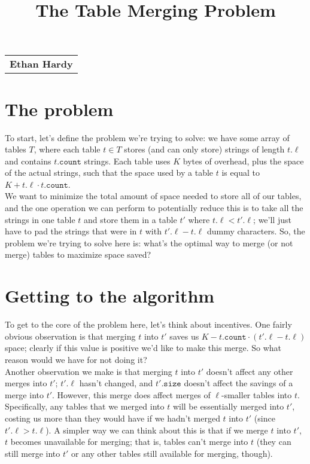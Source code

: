 \documentclass{article}[12]
\title{\textbf{The Table Merging Problem}\vspace{-5ex}}
\date{}
\begin{document}
\maketitle

\null\hfill\begin{tabular}[t]{l@{}}
  \textbf{Ethan Hardy} \\
\end{tabular}

\section{The problem}

To start, let's define the problem we're trying to solve: we have some array of tables $T$, where each table $t \in T$ stores (and can only store) strings of length $t.\ell$ and contains $t.\texttt{count}$ strings. Each table uses $K$ bytes of overhead, plus the space of the actual strings, such that the space used by a table $t$ is equal to $K + t.\ell \cdot t.\texttt{count}$.\\

We want to minimize the total amount of space needed to store all of our tables, and the one operation we can perform to potentially reduce this is to take all the strings in one table $t$ and store them in a table $t'$ where $t.\ell < t'.\ell$; we'll just have to pad the strings that were in $t$ with $t'.\ell - t.\ell$ dummy characters. So, the problem we're trying to solve here is: what's the optimal way to merge (or not merge) tables to maximize space saved?

\section{Getting to the algorithm}
To get to the core of the problem here, let's think about incentives. One fairly obvious observation is that merging $t$ into $t'$ saves us $K - t.\texttt{count} \cdot (t'.\ell - t.\ell)$ space; clearly if this value is positive we'd like to make this merge. So what reason would we have for not doing it?\\

Another observation we make is that merging $t$ into $t'$ doesn't affect any other merges into $t'$; $t'.\ell$ hasn't changed, and $t'.\texttt{size}$ doesn't affect the savings of a merge into $t'$. However, this merge does affect merges of $\ell$-smaller tables into $t$. Specifically, any tables that we merged into $t$ will be essentially merged into $t'$, costing us more than they would have if we hadn't merged $t$ into $t'$ (since $t'.\ell > t.\ell$). A simpler way we can think about this is that if we merge $t$ into $t'$, $t$ becomes unavailable for merging; that is, tables can't merge into $t$ (they can still merge into $t'$ or any other tables still available for merging, though).\\
\end{document}
